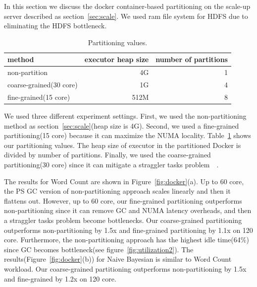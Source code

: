 In this section we discuss the docker container-based partitioning on the
scale-up server described as section~\ref{sec:scale}.
We used ram file system for HDFS due to eliminating the HDFS bottleneck.


\begin{table}[h!]
  \centering
  \small
  \begin{tabular}{l r r} \toprule
    method & executor heap size & number of partitions\\
    \midrule
    non-partition & 4G & 1  \\ 
    coarse-grained(30 core) & 1G & 4\\
    fine-grained(15 core) & 512M & 8\\
    \bottomrule
  \end{tabular}
  \caption{Partitioning values.}
  \label{tab:memusepart}
\end{table}




We used three different experiment settings.
First, we used the non-partitioning method as section~\ref{sec:scale}(heap size is 4G).
Second, we used a fine-grained partitioning(15 core) 
because it can maximize the NUMA locality.
Table~\ref{tab:memusepart} shows our partitioning values.
The heap size of executor in the partitioned Docker is divided
by number of partitions.
Finally, we used the coarse-grained partitioning(30 core) 
since it can mitigate a straggler tasks problem~\cite{Ousterhout2015MSP}~\cite{Ren2015HDS}.

The results for Word Count are shown in Figure~\ref{fig:docker}(a).
Up to 60 core, the PS GC version of non-partitioning approach scales linearly and
then it flattens out.
However, up to 60 core, our fine-grained partitioning outperforms non-partitioning
since it can remove GC and NUMA latency overheads, and then a straggler tasks
problem become bottlenecks.
Our coarse-grained partitioning outperforms non-partitioning by 1.5x and
fine-grained partitioning by 1.1x on 120 core.
Furthermore, the non-partitioning approach has the highest idle time(64\%) since
GC becomes bottleneck(see figure~\ref{fig:utilization2}). 
The results(Figure~\ref{fig:docker}(b)) for Naive Bayesian is similar to Word Count
workload.
Our coarse-grained partitioning outperforms non-partitioning by 1.5x and fine-grained
by 1.2x on 120 core.


